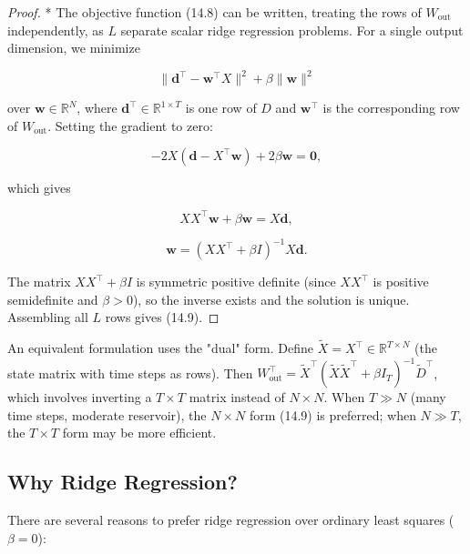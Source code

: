 \begin{proof}
* The objective function (14.8) can be written, treating the rows of $W_{\text{out}}$ independently, as $L$ separate scalar ridge regression problems. For a single output dimension, we minimize

\[
\|\mathbf{d}^\top - \mathbf{w}^\top X\|^2 + \beta \|\mathbf{w}\|^2
\]

over $\mathbf{w} \in \mathbb{R}^N$, where $\mathbf{d}^\top \in \mathbb{R}^{1 \times T}$ is one row of $D$ and $\mathbf{w}^\top$ is the corresponding row of $W_{\text{out}}$. Setting the gradient to zero:

\[
-2 X(\mathbf{d} - X^\top \mathbf{w}) + 2\beta \mathbf{w} = \mathbf{0},
\]

which gives

\[
X X^\top \mathbf{w} + \beta \mathbf{w} = X \mathbf{d},
\]

\[
\mathbf{w} = (X X^\top + \beta I)^{-1} X \mathbf{d}.
\]

The matrix $X X^\top + \beta I$ is symmetric positive definite (since $X X^\top$ is positive semidefinite and $\beta > 0$), so the inverse exists and the solution is unique. Assembling all $L$ rows gives (14.9).
\end{proof}


\begin{remark}
An equivalent formulation uses the "dual" form. Define $\tilde{X} = X^\top \in \mathbb{R}^{T \times N}$ (the state matrix with time steps as rows). Then $W_{\text{out}}^\top = \tilde{X}^\top (\tilde{X}\tilde{X}^\top + \beta I_T)^{-1} \tilde{D}^\top$, which involves inverting a $T \times T$ matrix instead of $N \times N$. When $T \gg N$ (many time steps, moderate reservoir), the $N \times N$ form (14.9) is preferred; when $N \gg T$, the $T \times T$ form may be more efficient.
\end{remark}


\subsection{Why Ridge Regression?}\label{sec:14.5.4}

There are several reasons to prefer ridge regression over ordinary least squares ($\beta = 0$):

